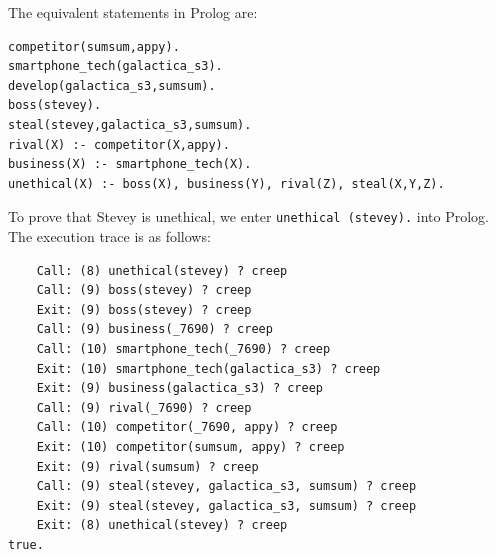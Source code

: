 \documentclass[11pt]{report}
\begin{document}
The equivalent statements in Prolog are:

\begin{lstlisting}
competitor(sumsum,appy).
smartphone_tech(galactica_s3).
develop(galactica_s3,sumsum).
boss(stevey).
steal(stevey,galactica_s3,sumsum).
rival(X) :- competitor(X,appy).
business(X) :- smartphone_tech(X).
unethical(X) :- boss(X), business(Y), rival(Z), steal(X,Y,Z).
\end{lstlisting}

To prove that Stevey is unethical, we enter \texttt{unethical\,(stevey).} into
Prolog. The execution trace is as follows:

\begin{lstlisting}
    Call: (8) unethical(stevey) ? creep
    Call: (9) boss(stevey) ? creep
    Exit: (9) boss(stevey) ? creep
    Call: (9) business(_7690) ? creep
    Call: (10) smartphone_tech(_7690) ? creep
    Exit: (10) smartphone_tech(galactica_s3) ? creep
    Exit: (9) business(galactica_s3) ? creep
    Call: (9) rival(_7690) ? creep
    Call: (10) competitor(_7690, appy) ? creep
    Exit: (10) competitor(sumsum, appy) ? creep
    Exit: (9) rival(sumsum) ? creep
    Call: (9) steal(stevey, galactica_s3, sumsum) ? creep
    Exit: (9) steal(stevey, galactica_s3, sumsum) ? creep
    Exit: (8) unethical(stevey) ? creep
true.
\end{lstlisting}
\end{document}
